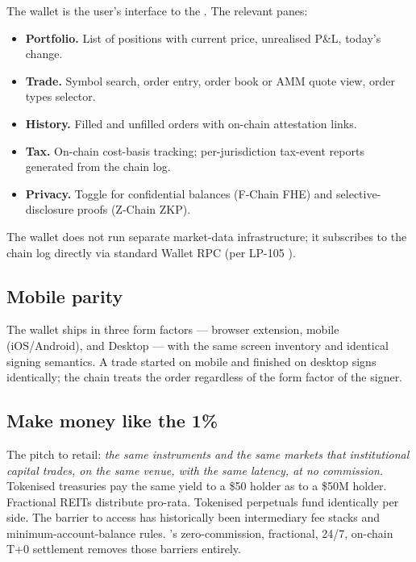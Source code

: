 The wallet is the user's interface to the \DEX{}. The relevant
panes:

\begin{itemize}[leftmargin=1.2em]
  \item \textbf{Portfolio.} List of positions with current price,
        unrealised P\&L, today's change.
  \item \textbf{Trade.} Symbol search, order entry, order book or
        AMM quote view, order types selector.
  \item \textbf{History.} Filled and unfilled orders with on-chain
        attestation links.
  \item \textbf{Tax.} On-chain cost-basis tracking; per-jurisdiction
        tax-event reports generated from the chain log.
  \item \textbf{Privacy.} Toggle for confidential balances (F-Chain
        FHE) and selective-disclosure proofs (Z-Chain ZKP).
\end{itemize}

The wallet does not run separate market-data infrastructure; it
subscribes to the chain log directly via standard \Lux{} Wallet
RPC (per LP-105 \cite{lp-105}).

\subsection{Mobile parity}

The wallet ships in three form factors --- browser extension,
mobile (iOS/Android), and \Lux{} Desktop --- with the same screen
inventory and identical signing semantics. A trade started on
mobile and finished on desktop signs identically; the chain
treats the order regardless of the form factor of the signer.

\subsection{Make money like the 1\%}

The pitch to retail: \emph{the same instruments and the same
markets that institutional capital trades, on the same venue, with
the same latency, at no commission.} Tokenised treasuries pay the
same yield to a \$50 holder as to a \$50M holder. Fractional REITs
distribute pro-rata. Tokenised perpetuals fund identically per side.
The barrier to access has historically been intermediary fee stacks
and minimum-account-balance rules. \Zoo{} \DEX{}'s zero-commission,
fractional, 24/7, on-chain T+0 settlement removes those barriers
entirely.

